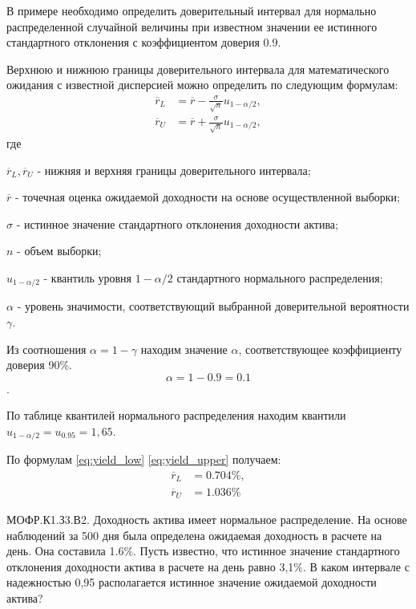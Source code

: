 \documentclass[12pt, table, a4paper,twoside]{exam}
\begin{document}
\begin{questions}
\begin{solution}[4em]
	В примере необходимо определить доверительный интервал для нормально распределенной случайной величины при известном значении ее истинного стандартного отклонения с коэффициентом доверия 0.9.
	
	Верхнюю и нижнюю границы доверительного интервала для математического ожидания с известной дисперсией можно определить по следующим формулам:
	\begin{align}
	\label{eq:yield_low}
	\overline{r}_L &=\overline{r}-\frac{\sigma}{\sqrt{n}}u_{1-\alpha/2},\\[8pt]
	\label{eq:yield_upper}
	\overline{r}_U &=\overline{r}+\frac{\sigma}{\sqrt{n}}u_{1-\alpha/2},
	\end{align}
	где
	
	$\overline{r}_L, \overline{r}_U$ - нижняя и верхняя  границы доверительного интервала;
	
	$\overline{r}$ - точечная оценка ожидаемой доходности на основе осуществленной выборки;
	
	$\sigma$ - истинное значение стандартного отклонения доходности актива;
	
	$n$ - объем выборки;
	
	$u_{1-\alpha/2}$ - квантиль уровня $1-\alpha/2$ стандартного нормального распределения;
	
	$\alpha$ - уровень значимости, соответствующий выбранной доверительной вероятности $\gamma$.
	
	Из соотношения $\alpha=1-\gamma$ находим значение $\alpha$, соответствующее коэффициенту доверия 90\%.
	$$\alpha=1-0.9=0.1$$.
	
	По таблице квантилей нормального распределения находим квантили $u_{1-\alpha/2}=u_{0.95}=1,65$.
	
	По формулам \eqref{eq:yield_low} \eqref{eq:yield_upper} получаем:
	\begin{align*}
	\overline{r}_L&=0.704\%, \\
	\overline{r}_U&=1.036\%
	\end{align*}
\end{solution}

\question[10] МОФР.К1.З3.В2. Доходность актива имеет нормальное распределение. На основе наблюдений за 500 дня была определена ожидаемая доходность в расчете на день. Она составила 1.6\%. Пусть известно, что истинное значение стандартного отклонения доходности актива в расчете на день равно 3,1\%. В каком интервале с надежностью 0,95 располагается истинное значение ожидаемой доходности актива?

\begin{solution}[4em]
	

\end{solution}
\end{questions}
\end{document}
